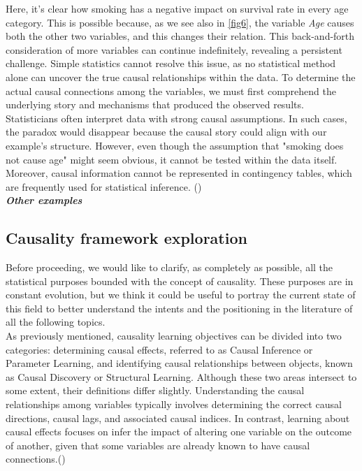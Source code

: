Here, it's clear how smoking has a negative impact on survival rate in every age category. This is possible because, as we see also in \ref{fig6}, the variable \textit{Age} causes both the other two variables, and this changes their relation. This back-and-forth consideration of more variables can continue indefinitely, revealing a persistent challenge. Simple statistics cannot resolve this issue, as no statistical method alone can uncover the true causal relationships within the data. To determine the actual causal connections among the variables, we must first comprehend the underlying story and mechanisms that produced the observed results. Statisticians often interpret data with strong causal assumptions. In such cases, the paradox would disappear because the causal story could align with our example’s structure. However, even though the assumption that "smoking does not cause age" might seem obvious, it cannot be tested within the data itself. Moreover, causal information cannot be represented in contingency tables, which are frequently used for statistical inference. (\cite{pearl2016causal})\\

\textbf{\textit{Other examples}}\\

\subsection{Causality framework exploration}\label{Causality framework exploration}
Before proceeding, we would like to clarify, as completely as possible, all the statistical purposes bounded with the concept of causality. These purposes are in constant evolution, but we think it could be useful to portray the current state of this field to better understand the intents and the positioning in the literature of all the following topics.\\

As previously mentioned, causality learning objectives can be divided into two categories: determining causal effects, referred to as Causal Inference or Parameter Learning, and identifying causal relationships between objects, known as Causal Discovery or Structural Learning. Although these two areas intersect to some extent, their definitions differ slightly.
Understanding the causal relationships among variables typically involves determining the correct causal directions, causal lags, and associated causal indices. In contrast, learning about causal effects focuses on infer the impact of altering one variable on the outcome of another, given that some variables are already known to have causal connections.(\cite{chang2021multivariate})\\

